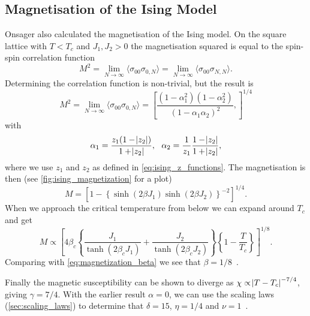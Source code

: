 \documentclass[11pt, a4paper]{report} %
\begin{document}
\subsection{Magnetisation of the Ising Model}\label{sec:ising_magnetization}

Onsager also calculated the magnetisation of the Ising model.
On the square lattice with \(T < T_c\) and \(J_1, J_2 > 0\) the magnetisation squared is equal to the spin-spin correlation function
\begin{equation}
	M^2 = \lim_{N \to \infty} \langle \sigma_{00} \sigma_{0,N} \rangle = \lim_{N \to \infty} \langle \sigma_{00} \sigma_{N, N} \rangle.
\end{equation}
Determining the correlation function is non-trivial, but the result is
\begin{equation}
	M^2 = \lim_{N \to \infty} \langle \sigma_{00} \sigma_{0,N} \rangle = \left[ \frac{(1-\alpha_1^2)(1-\alpha_2^2)}{(1-\alpha_1 \alpha_2)^2}, \right]^{1/4}
\end{equation}
with
\begin{equation}
	\alpha_1 = \frac{z_1(1-\abs{z_2})}{1+\abs{z_2}},\ \ \alpha_2 = \frac{1}{z_1}\frac{1-\abs{z_2}}{1+\abs{z_2}},
\end{equation}
where we use \(z_1\) and \(z_2\) as defined in \cref{eq:ising_z_functions}.
The magnetisation is then (see \cref{fig:ising_magnetization} for a plot)
\begin{equation}
	M = \left[1 - \left\{\sinh(2\beta J_1)\sinh(2 \beta J_2)\right\}^{-2} \right]^{1/4}.
\end{equation}
When we approach the critical temperature from below we can expand around \(T_c\) and get
\begin{equation}
	M \propto \left[4\beta_c\left\{\frac{J_1}{\tanh(2\beta_c J_1)} + \frac{J_2}{\tanh(2\beta_c J_2)}\right\} \left\{1-\frac{T}{T_c}\right\}\right]^{1/8}.
\end{equation}
Comparing with \cref{eq:magnetization_beta} we see that \(\beta = 1/8\)~\cite{wu:1982}.

Finally the magnetic susceptibility can be shown to diverge as \(\chi \propto \abs{T - T_c}^{-7/4}\), giving \(\gamma = 7/4\).
With the earlier result \(\alpha=0\), we can use the scaling laws (\cref{sec:scaling_laws}) to determine that \(\delta = 15\), \(\eta = 1/4\) and \(\nu = 1\)~\cite{binney:1992}.
\end{document}
